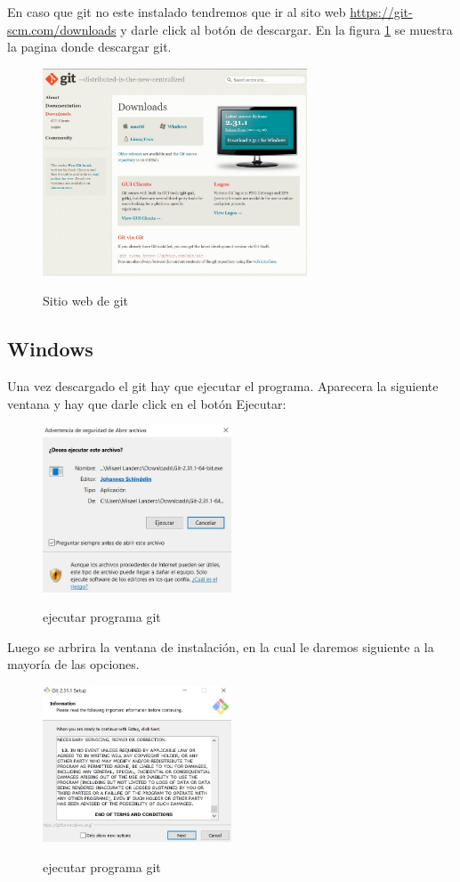 \documentclass[11pt, oneside]{article}
\begin{document}
En caso que git no este instalado tendremos que ir al sito web \url{https://git-scm.com/downloads} y darle click al botón de descargar. En la figura \ref{fig:git-web} se muestra la pagina donde descargar git.
\begin{figure}[h]
  \centering
  \caption{Sitio web de git}
  \includegraphics[width=0.70\textwidth]{./img/ind-from-web.jpeg}
  \label{fig:git-web}
\end{figure}

\subsection{Windows}
Una vez descargado el git hay que ejecutar el programa. Aparecera la siguiente ventana y hay que darle click en el botón Ejecutar:
\begin{figure}[!h]
  \centering
  \caption{ejecutar programa git}
  \includegraphics[width=0.50\textwidth]{./img/win/ins-win-1.jpeg}
  \label{fig:git-ins-1}
\end{figure}

Luego se arbrira la ventana de instalación, en la cual le daremos siguiente a la mayoría de las opciones.

\begin{figure}[h]
  \centering
  \caption{ejecutar programa git}
  \includegraphics[width=0.50\textwidth]{./img/win/ins-win-2.jpeg}
  \label{fig:git-ins-2}
\end{figure}
\end{document}
